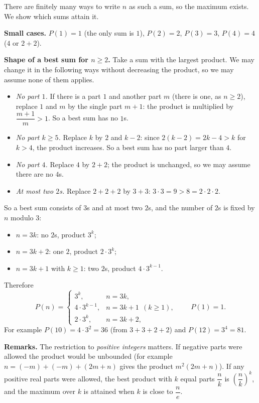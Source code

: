 There are finitely many ways to write $n$ as such a sum, so the maximum exists. We show which sums attain it.

\textbf{Small cases.} $P(1)=1$ (the only sum is $1$), $P(2)=2$, $P(3)=3$, $P(4)=4$ ($4$ or $2+2$).

\textbf{Shape of a best sum for $n\ge2$.} Take a sum with the largest product. We may change it in the following ways without decreasing the product, so we may assume none of them applies.
\begin{itemize}
\item \emph{No part $1$.} If there is a part $1$ and another part $m$ (there is one, as $n\ge2$), replace $1$ and $m$ by the single part $m+1$: the product is multiplied by $\dfrac{m+1}{m}>1$. So a best sum has no $1$s.
\item \emph{No part $k\ge5$.} Replace $k$ by $2$ and $k-2$: since $2(k-2)=2k-4>k$ for $k>4$, the product increases. So a best sum has no part larger than $4$.
\item \emph{No part $4$.} Replace $4$ by $2+2$; the product is unchanged, so we may assume there are no $4$s.
\item \emph{At most two $2$s.} Replace $2+2+2$ by $3+3$: $3\cdot3=9>8=2\cdot2\cdot2$.
\end{itemize}
So a best sum consists of $3$s and at most two $2$s, and the number of $2$s is fixed by $n$ modulo $3$:
\begin{itemize}
\item $n=3k$: no $2$s, product $3^{k}$;
\item $n=3k+2$: one $2$, product $2\cdot3^{k}$;
\item $n=3k+1$ with $k\ge1$: two $2$s, product $4\cdot3^{k-1}$.
\end{itemize}
Therefore
\[
\boxed{P(n)=\begin{cases}3^{k}, & n=3k,\\ 4\cdot3^{k-1}, & n=3k+1\ \ (k\ge1),\\ 2\cdot3^{k}, & n=3k+2,\end{cases}\qquad P(1)=1.}
\]
For example $P(10)=4\cdot3^2=36$ (from $3+3+2+2$) and $P(12)=3^4=81$.

\textbf{Remarks.} The restriction to \emph{positive integers} matters. If negative parts were allowed the product would be unbounded (for example $n=(-m)+(-m)+(2m+n)$ gives the product $m^2(2m+n)$). If any positive real parts were allowed, the best product with $k$ equal parts $\dfrac {n}{k}$ is $\left(\dfrac {n}{k}\right)^k$, and the maximum over $k$ is attained when $k$ is close to $\dfrac {n}{e}$.
